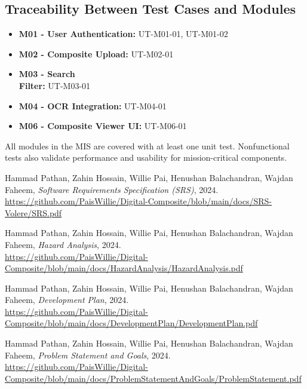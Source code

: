 \documentclass[12pt, titlepage]{article}
\begin{document}
\subsection{Traceability Between Test Cases and Modules}

\begin{itemize}
  \item \textbf{M01 - User Authentication:} UT-M01-01, UT-M01-02
  \item \textbf{M02 - Composite Upload:} UT-M02-01
  \item \textbf{M03 - Search \\ Filter:} UT-M03-01
  \item \textbf{M04 - OCR Integration:} UT-M04-01
  \item \textbf{M06 - Composite Viewer UI:} UT-M06-01
\end{itemize}

All modules in the MIS are covered with at least one unit test. Nonfunctional tests also validate performance and usability for mission-critical components.
				



\newpage

\begin{thebibliography}{9}

Hammad Pathan, Zahin Hossain, Willie Pai, Henushan Balachandran, Wajdan Faheem, 
\textit{Software Requirements Specification (SRS)}, 2024. \\
\url{https://github.com/PaisWillie/Digital-Composite/blob/main/docs/SRS-Volere/SRS.pdf}

Hammad Pathan, Zahin Hossain, Willie Pai, Henushan Balachandran, Wajdan Faheem, 
\textit{Hazard Analysis}, 2024. \\
\url{https://github.com/PaisWillie/Digital-Composite/blob/main/docs/HazardAnalysis/HazardAnalysis.pdf}

Hammad Pathan, Zahin Hossain, Willie Pai, Henushan Balachandran, Wajdan Faheem, 
\textit{Development Plan}, 2024. \\
\url{https://github.com/PaisWillie/Digital-Composite/blob/main/docs/DevelopmentPlan/DevelopmentPlan.pdf}

Hammad Pathan, Zahin Hossain, Willie Pai, Henushan Balachandran, Wajdan Faheem, 
\textit{Problem Statement and Goals}, 2024. \\
\url{https://github.com/PaisWillie/Digital-Composite/blob/main/docs/ProblemStatementAndGoals/ProblemStatement.pdf}

\end{thebibliography}
\end{document}
